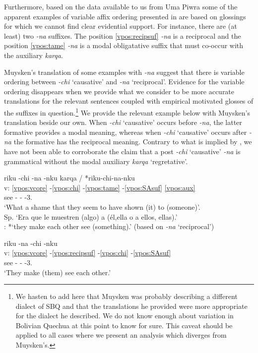 \documentclass[output=paper]{langscibook}
\begin{document}
Furthermore, based on the data available to us from Uma Piwra some of the apparent examples of variable affix ordering presented in \citet[636]{muysken:1986affixorder} are based on glossings for which we cannot find clear evidential support. For instance, there are (at least) two \textit{-na} suffixes. The position \ref{vpos:recipsuf} \textit{-na} is a reciprocal and the position \ref{vpos:tame} \textit{-na} is a modal obligatative suffix that must co-occur with the auxiliary \textit{karqa}. 

Muysken's translation of some examples with \textit{-na} suggest that there is variable ordering between \textit{-chi} `causative' and \textit{-na} `reciprocal'. Evidence for the variable ordering disappears when we provide what we consider to be more accurate translations for the relevant sentences coupled with empirical motivated glosses of the suffixes in question.\footnote{We hasten to add here that Muysken was probably describing a different dialect of SBQ and that the translations he provided were more appropriate for the dialect he described. We do not know enough about variation in Bolivian Quechua at this point to know for sure. This caveat should be applied to all cases where we present an analysis which diverges from Muysken's.} We provide the relevant example below with Muysken's translation beside our own. When \textit{-chi} `causative' occurs before \textit{-na}, the latter formative provides a modal meaning, whereas when \textit{-chi} `causative' occurs after \textit{-na} the formative has the reciprocal meaning. Contrary to what is implied by \citet[634]{muysken:1986affixorder}, we have not been able to corroborate the claim that a post \textit{-chi} `causative' \textit{-na} is grammatical without the modal auxiliary \textit{karqa} `regretative'.

\ea \label{ex:china}
	\glll {} riku -chi -na -nku karqa / *riku-chi-na-nku \\
	    	v: \ref{vpos:vcore} -\ref{vpos:chi} -\ref{vpos:tame} -\ref{vpos:SAsuf} \ref{vpos:aux} \\
		    {} see -\Caus{} -\Oblig{} -3.\Pl{} \Regret{}  \\
	\glt `What a shame that they seem to have shown (it) to (someone)'. \\ Sp. `Era que le muestren (algo) a (él,ella o a ellos, ellas).' \\   
 \citet[636]{muysken:1986affixorder}: *`they make each other see (something).' (based on \textit{-na} ‘reciprocal')
\z

\ea \label{ex:nachi}
	\glll {} riku -na -chi -nku 	\\
	    	v: \ref{vpos:vcore} -\ref{vpos:recipsuf} -\ref{vpos:chi} -\ref{vpos:SAsuf}  \\
		    {} see -\Recp{} -\Caus{} -3.\Pl{} \\
	\glt `They make (them) see each other.' \hfill \citep[44]{muysken1989:dialectvariationquechua}
\z
\end{document}
